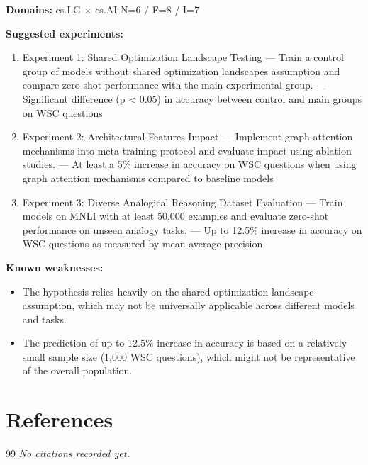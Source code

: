 \documentclass[12pt,a4paper]{article}
\begin{document}
\noindent\textbf{Domains:} cs.LG $\times$ cs.AI
\hspace{1em} N=6 / F=8 / I=7

\textbf{Suggested experiments:}
\begin{enumerate}
  \item Experiment 1: Shared Optimization Landscape Testing — Train a control group of models without shared optimization landscapes assumption and compare zero-shot performance with the main experimental group. — Significant difference (p < 0.05) in accuracy between control and main groups on WSC questions
  \item Experiment 2: Architectural Features Impact — Implement graph attention mechanisms into meta-training protocol and evaluate impact using ablation studies. — At least a 5\% increase in accuracy on WSC questions when using graph attention mechanisms compared to baseline models
  \item Experiment 3: Diverse Analogical Reasoning Dataset Evaluation — Train models on MNLI with at least 50,000 examples and evaluate zero-shot performance on unseen analogy tasks. — Up to 12.5\% increase in accuracy on WSC questions as measured by mean average precision
\end{enumerate}

\textbf{Known weaknesses:}
\begin{itemize}
  \item The hypothesis relies heavily on the shared optimization landscape assumption, which may not be universally applicable across different models and tasks.
  \item The prediction of up to 12.5\% increase in accuracy is based on a relatively small sample size (1,000 WSC questions), which might not be representative of the overall population.
\end{itemize}


\section{References}

\begin{thebibliography}{99}
\textit{No citations recorded yet.}
\end{thebibliography}
\end{document}

